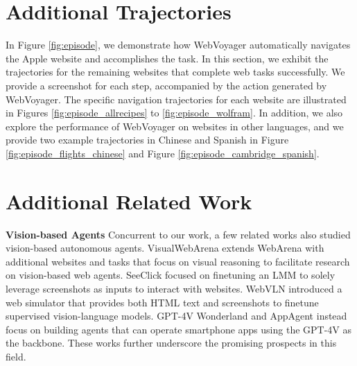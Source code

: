 \documentclass[11pt]{article}
\begin{document}
\section{Additional Trajectories}\label{sec:additional_traj}
In Figure \ref{fig:episode}, we demonstrate how WebVoyager automatically navigates the Apple website and accomplishes the task.
In this section, we exhibit the trajectories for the remaining websites that complete web tasks successfully. We provide a screenshot for each step, accompanied by the action generated by WebVoyager. The specific navigation trajectories for each website are illustrated in Figures \ref{fig:episode_allrecipes} to \ref{fig:episode_wolfram}. In addition, we also explore the performance of WebVoyager on websites in other languages, and we provide two example trajectories in Chinese and Spanish in Figure \ref{fig:episode_flights_chinese} and Figure \ref{fig:episode_cambridge_spanish}.


\section{Additional Related Work}
\textbf{Vision-based Agents} Concurrent to our work, a few related works also studied vision-based autonomous agents. VisualWebArena \cite{koh2024visualwebarena} extends WebArena with additional websites and tasks that focus on visual reasoning to facilitate research on vision-based web agents. SeeClick \cite{cheng2024seeclick} focused on finetuning an LMM to solely leverage screenshots as inputs to interact with websites. WebVLN \cite{chen2023webvln} introduced a web simulator that provides both HTML text and screenshots to finetune supervised vision-language models. GPT-4V Wonderland \cite{yan2023gpt4v} and AppAgent \cite{zhang2023appagent} instead focus on building agents that can operate smartphone apps using the GPT-4V as the backbone. These works further underscore the promising prospects in this field.
 
\end{document}
